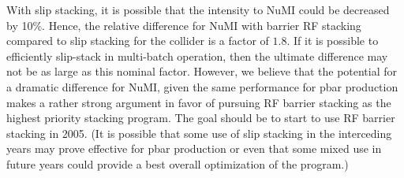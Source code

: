 \documentclass{article}
\begin{document}
With slip stacking,
it is possible that the intensity to NuMI could be decreased by 10\%. Hence,
the relative difference for NuMI with barrier RF stacking compared to
slip stacking for the collider is a factor of $1.8$. If it is possible to
efficiently slip-stack in multi-batch operation, then the ultimate
difference may not be as large as this nominal factor. However, 
we believe that the potential for a dramatic difference for NuMI, 
given the same performance
for pbar production makes a rather strong argument in favor of pursuing
RF barrier stacking as the highest priority stacking program. 
The goal should be to start to use RF barrier stacking in 2005. (It is
possible that some use of slip stacking in the interceding years may prove
effective for pbar production or even that some mixed use in future
years could provide a best overall optimization of the program.)
\end{document}
